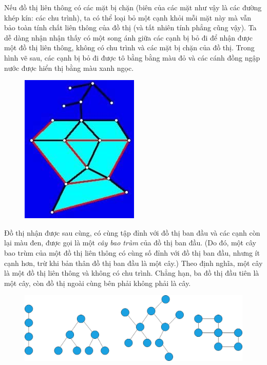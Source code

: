 \begin{multicols}{2}
\begin{figure}[H]
		\vspace*{-10pt}
	\end{figure}
	Nếu đồ thị liên thông có các mặt bị chặn (biên của các mặt như vậy là các đường khép kín: các chu trình),  ta có thể loại bỏ một cạnh khỏi mỗi mặt này mà vẫn bảo toàn tính chất liên thông của đồ thị (và tất nhiên tính phẳng cũng vậy). 
	\vskip 0.1cm
	Ta dễ dàng nhận nhận thấy có một song ánh giữa các cạnh bị bỏ đi để nhận được một đồ thị liên thông, không có chu trình và các mặt bị chặn của đồ thị. Trong hình vẽ sau, các cạnh bị bỏ đi được tô bằng bằng màu đỏ và các cánh đồng ngập nước được hiển thị bằng màu xanh ngọc.
	\begin{figure}[H]
		\centering
		\vspace*{-5pt}
		\captionsetup{labelformat= empty, justification=centering}
		\includegraphics[width=0.5\linewidth]{proof_Euler_3}
		\vspace*{-10pt}
	\end{figure}
	Đồ thị nhận được sau cùng, có cùng tập đỉnh với đồ thị ban đầu và các cạnh còn lại màu đen, được gọi là một \emph{cây bao trùm} của đồ thị ban đầu.  (Do đó, một cây bao trùm của một đồ thị liên thông có cùng số đỉnh với đồ thị ban đầu, nhưng ít cạnh hơn, trừ khi bản thân đồ thị ban đầu là một cây.) Theo định nghĩa, một cây là một đồ thị liên thông và không có chu trình. 
	\vskip 0.1cm
	Chẳng hạn, ba đồ thị đầu tiên là một cây, còn đồ thị ngoài cùng bên phải không phải là cây.
	\begin{figure}[H]
		\centering
		\vspace*{5pt}
		\captionsetup{labelformat= empty, justification=centering}
		\includegraphics[width=1\linewidth]{trees}

\end{figure}
\end{multicols}
